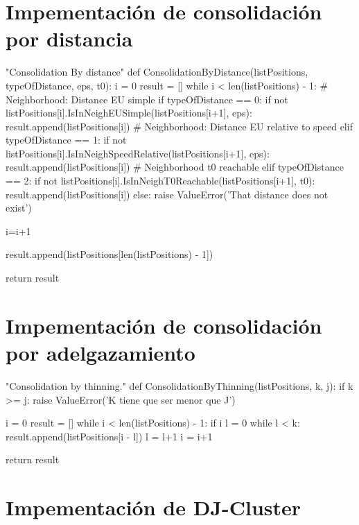\documentclass[a4paper, 12pt]{article}
\begin{document}
\newpage


\appendix


\section{Impementaci\'on de consolidaci\'on por distancia} \label{App:AppendixA}

\begin{python}
"Consolidation By distance"
def ConsolidationByDistance(listPositions, typeOfDistance, eps, t0):
	i = 0
	result = []
	while i < len(listPositions) - 1:
		# Neighborhood: Distance EU simple
		if typeOfDistance == 0:
			if not listPositions[i].IsInNeighEUSimple(listPositions[i+1], eps):
				result.append(listPositions[i])
		# Neighborhood: Distance EU relative to speed
		elif typeOfDistance == 1:
			if not listPositions[i].IsInNeighSpeedRelative(listPositions[i+1], eps):
				result.append(listPositions[i])
		# Neighborhood t0 reachable
		elif typeOfDistance == 2:
			if not listPositions[i].IsInNeighT0Reachable(listPositions[i+1], t0):
				result.append(listPositions[i])
		else:
			raise ValueError('That distance does not exist')

		i=i+1

	result.append(listPositions[len(listPositions) - 1])

	return result

\end{python}

\newpage
\section{Impementaci\'on de consolidaci\'on por adelgazamiento} \label{App:AppendixB}

\begin{python}
"Consolidation by thinning."
def ConsolidationByThinning(listPositions, k, j):
	if k >= j:
		raise ValueError('K tiene que ser menor que J')
        
	i = 0
	result = []
	while i < len(listPositions) - 1:
		if i%
			l = 0
			while l < k:
				result.append(listPositions[i - l])
				l = l+1
			i = i+1

	return result
\end{python}


\newpage
\section{Impementaci\'on de DJ-Cluster} \label{App:AppendixC}
\end{document}
